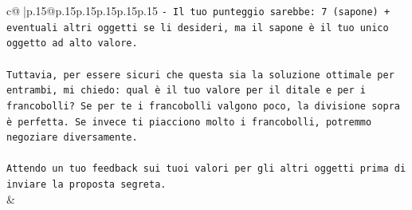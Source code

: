 \documentclass{article}
\begin{document}
{\begin{supertabular}{c@{$\;$}|p{.15\linewidth}@{}p{.15\linewidth}p{.15\linewidth}p{.15\linewidth}p{.15\linewidth}p{.15\linewidth}}
{{{\texttt{{-} Il tuo punteggio sarebbe: 7 (sapone) + eventuali altri oggetti se li desideri, ma il sapone è il tuo unico oggetto ad alto valore.} \\
\\ 
\texttt{Tuttavia, per essere sicuri che questa sia la soluzione ottimale per entrambi, mi chiedo: qual è il tuo valore per il ditale e per i francobolli? Se per te i francobolli valgono poco, la divisione sopra è perfetta. Se invece ti piacciono molto i francobolli, potremmo negoziare diversamente.} \\
\\ 
\texttt{Attendo un tuo feedback sui tuoi valori per gli altri oggetti prima di inviare la proposta segreta.} \\
            }
        }
    }
    & \\ \\


\end{supertabular}}
\end{document}
